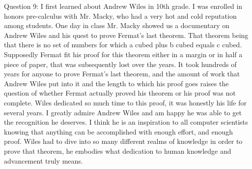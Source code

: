 \documentclass{article}
\begin{document}
Question 9: I first learned about Andrew Wiles in 10th grade. I was enrolled in honors pre-calculus with Mr. Macky, who had a very hot and cold reputation among students. One day in class Mr. Macky showed us a documentary on Andrew Wiles and his quest to prove Fermat's last theorem.
				  That theorem being that there is no set of numbers for which a cubed plus b cubed equals c cubed. Supposedly Fermat fit his proof for this theorem either in a margin or in half a piece of paper, that was subsequently lost over the years.
				  It took hundreds of years for anyone to prove Fermat's last theorem, and the amount of work that Andrew Wiles put into it and the length to which his proof goes raises the question of whether Fermat actually proved his theorem or his proof was not complete.
				  Wiles dedicated so much time to this proof, it was honestly his life for several years. I greatly admire Andrew Wiles and am happy he was able to get the recognition he deserves. I think he is an inspiration to all computer scientists knowing that anything can be accomplished with enough effort, and enough proof.
				  Wiles had to dive into so many different realms of knowledge in order to prove that theorem, he embodies what dedication to human knowledge and advancement truly means.
		
		
	
\end{document}
